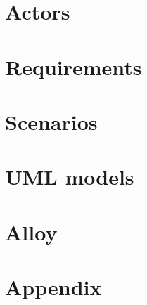 \documentclass[a4paper]{article}
\begin{document}
\newpage

\section{Actors}


\newpage

\section{Requirements}


\newpage

\section{Scenarios}


\newpage

\section{UML models}


\newpage

\section{Alloy}


\newpage

\section{Appendix}

\end{document}
